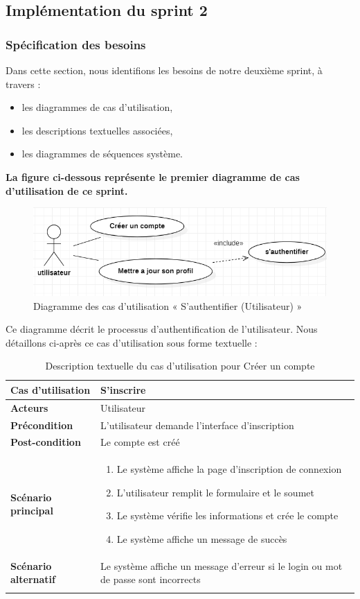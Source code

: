 \subsection{Implémentation du sprint 2}
\subsubsection{Spécification des besoins}
Dans cette section, nous identifions les besoins de notre deuxième sprint, à travers :
\begin{itemize}
    \item les diagrammes de cas d'utilisation,
    \item les descriptions textuelles associées,
    \item les diagrammes de séquences système.
\end{itemize}

\textbf{La figure ci-dessous représente le premier diagramme de cas d'utilisation de ce sprint.}

\begin{figure}[H]
    \centering
    \includegraphics[width=0.6\linewidth]{projet/images/diagramme de sequance/images/utilisateur.png}
    \caption{Diagramme des cas d'utilisation « S'authentifier (Utilisateur) »}
    \label{fig:equipe_scrum}
\end{figure}

Ce diagramme décrit le processus d'authentification de l'utilisateur. Nous détaillons ci-après ce cas d'utilisation sous forme textuelle :

\begin{longtable}{|>{\bfseries}p{4cm}|p{10cm}|}
\hline
Cas d'utilisation & S'inscrire \\
\hline
Acteurs & Utilisateur \\
\hline
Précondition & L'utilisateur demande l'interface d'inscription \\
\hline
Post-condition & Le compte est créé \\
\hline
Scénario principal & 
\begin{enumerate}
  \item Le système affiche la page d'inscription de connexion
  \item L'utilisateur remplit le formulaire et le soumet
  \item Le système vérifie les informations et crée le compte
  \item Le système affiche un message de succès
\end{enumerate} \\
\hline
Scénario alternatif & Le système affiche un message d'erreur si le login ou mot de passe sont incorrects \\
\hline
\caption{Description textuelle du cas d'utilisation pour Créer un compte}
\end{longtable}

